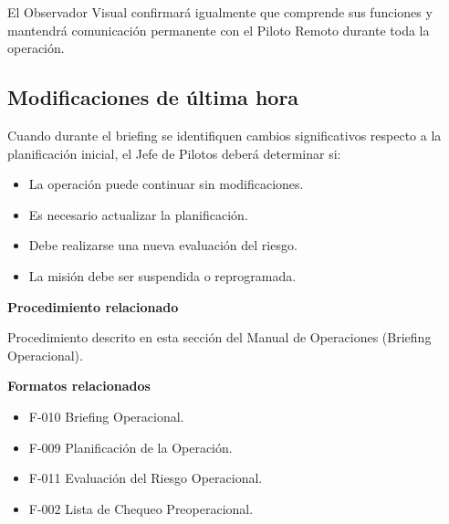 El Observador Visual confirmará igualmente que comprende sus funciones y mantendrá comunicación permanente con el Piloto Remoto durante toda la operación.

\subsection{Modificaciones de última hora}

Cuando durante el briefing se identifiquen cambios significativos respecto a la planificación inicial, el Jefe de Pilotos deberá determinar si:

\begin{itemize}

\item La operación puede continuar sin modificaciones.

\item Es necesario actualizar la planificación.

\item Debe realizarse una nueva evaluación del riesgo.

\item La misión debe ser suspendida o reprogramada.

\end{itemize}


\begin{tcolorbox}[title=Documentos asociados,colback=gray!5,colframe=black]

\textbf{Procedimiento relacionado}

Procedimiento descrito en esta sección del Manual de Operaciones (Briefing Operacional).

\vspace{0.2cm}

\textbf{Formatos relacionados}

\begin{itemize}

\item F-010 Briefing Operacional.

\item F-009 Planificación de la Operación.

\item F-011 Evaluación del Riesgo Operacional.

\item F-002 Lista de Chequeo Preoperacional.

\end{itemize}

\end{tcolorbox}


